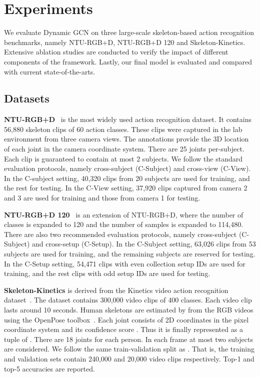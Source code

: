 \documentclass[sigconf]{acmart}
\begin{document}
\section{Experiments}
We evaluate Dynamic GCN on three large-scale skeleton-based action recognition benchmarks, namely NTU-RGB+D, NTU-RGB+D 120 and Skeleton-Kinetics. Extensive ablation studies are conducted to verify the impact of different components of the framework. Lastly, our final model is evaluated and compared with current state-of-the-arts.


\subsection{Datasets}


\noindent\textbf{NTU-RGB+D}~\cite{shahroudy} is the most widely used action recognition dataset. It contains 56,880 skeleton clips of 60 action classes. These clips were captured in the lab environment from three camera views. The annotations provide the 3D location  of each joint in the camera coordinate system. There are 25 joints per-subject. Each clip is guaranteed to contain at most 2 subjects. We follow the standard evaluation protocols, namely cross-subject (C-Subject) and cross-view (C-View). In the C-subject setting, 40,320 clips from 20 subjects are used for training, and the rest for testing. In the C-View setting, 37,920 clips captured from camera 2 and 3 are used for training and those from camera 1 for testing.

\noindent\textbf{NTU-RGB+D 120}~\cite{liu2019ntu} is an extension of NTU-RGB+D, where the number of classes is expanded to 120 and the number of samples is expanded to 114,480. There are also two recommended evaluation protocols, namely cross-subject (C-Subject) and cross-setup (C-Setup). In the C-Subject setting, 63,026 clips from 53 subjects are used for training, and the remaining subjects are reserved for testing. In the C-Setup setting, 54,471 clips with even collection setup IDs are used for training, and the rest clips with odd setup IDs are used for testing.

\noindent\textbf{Skeleton-Kinetics} is derived from the Kinetics video action recognition dataset~\cite{kay2017kinetics}. The dataset contains 300,000 video clips of 400 classes. Each video clip lasts around 10 seconds. Human skeletons are estimated by \cite{yanspatial} from the RGB videos using the OpenPose toolbox~\cite{cao2018openpose}. Each joint consists of 2D coordinates  in the pixel coordinate system and its confidence score . Thus it is finally represented as a tuple of . There are 18 joints for each person. In each frame at most two subjects are considered. We follow the same train-validation split as \cite{yanspatial}. That is, the training and validation sets contain 240,000 and 20,000 video clips respectively. Top-1 and top-5 accuracies are reported.
\end{document}
